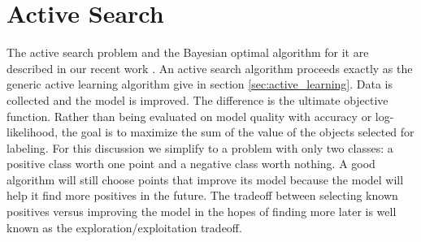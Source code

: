 \documentclass[prd,nofootbib,floatfix,11pt,tightenlines]{revtex4}
\begin{document}
%

\section{Active Search}
\label{sec:active_search}

The active search problem and the Bayesian optimal algorithm for it are
described in our recent work \cite{Garnett11,Garnett12}.  An active search
algorithm proceeds exactly as the generic active learning algorithm give in
section \ref{sec:active_learning}.  Data is collected and the model is
improved.  The difference is the ultimate objective function.  Rather than
being evaluated on model quality with accuracy or log-likelihood, the goal
is to maximize the sum of the value of the objects selected for labeling.
For this discussion we simplify to a problem with only two classes: a
positive class worth one point and a negative class worth nothing.  A good
algorithm will still choose points that improve its model because the model
will help it find more positives in the future.  The tradeoff between
selecting known positives versus improving the model in the hopes of
finding more later is well known as the exploration/exploitation tradeoff.
\end{document}
